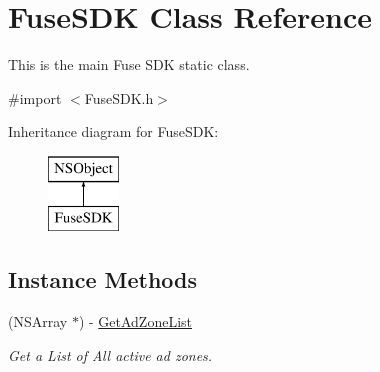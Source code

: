 \hypertarget{interface_fuse_s_d_k}{}\section{Fuse\+S\+D\+K Class Reference}
\label{interface_fuse_s_d_k}


This is the main Fuse S\+D\+K static class.  




{\ttfamily \#import $<$Fuse\+S\+D\+K.\+h$>$}

Inheritance diagram for Fuse\+S\+D\+K\+:\begin{figure}[H]
\begin{center}
\leavevmode
\includegraphics[height=2.000000cm]{interface_fuse_s_d_k}
\end{center}
\end{figure}
\subsection*{Instance Methods}
\begin{DoxyCompactItemize}
\item 
(N\+S\+Array $\ast$) -\/ \hyperlink{interface_fuse_s_d_k_aa268a44dea0b4db37d2d4ffa2c0ed23d}{Get\+Ad\+Zone\+List}
\begin{DoxyCompactList}\small\item\em Get a List of All active ad zones. \end{DoxyCompactList}\end{DoxyCompactItemize}
